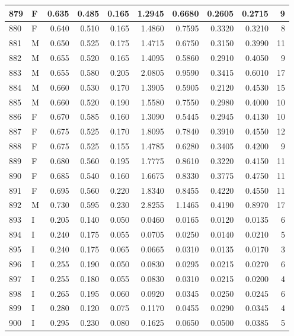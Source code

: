 \documentclass[9pt,twocolumn,twoside,]{pnas-new}
\begin{document}
\begin{tabular}{l|l|r|r|r|r|r|r|r|r}
\hline
879 & F & 0.635 & 0.485 & 0.165 & 1.2945 & 0.6680 & 0.2605 & 0.2715 & 9\\
\hline
880 & F & 0.640 & 0.510 & 0.165 & 1.4860 & 0.7595 & 0.3320 & 0.3210 & 8\\
\hline
881 & M & 0.650 & 0.525 & 0.175 & 1.4715 & 0.6750 & 0.3150 & 0.3990 & 11\\
\hline
882 & M & 0.655 & 0.520 & 0.165 & 1.4095 & 0.5860 & 0.2910 & 0.4050 & 9\\
\hline
883 & M & 0.655 & 0.580 & 0.205 & 2.0805 & 0.9590 & 0.3415 & 0.6010 & 17\\
\hline
884 & M & 0.660 & 0.530 & 0.170 & 1.3905 & 0.5905 & 0.2120 & 0.4530 & 15\\
\hline
885 & M & 0.660 & 0.520 & 0.190 & 1.5580 & 0.7550 & 0.2980 & 0.4000 & 10\\
\hline
886 & F & 0.670 & 0.585 & 0.160 & 1.3090 & 0.5445 & 0.2945 & 0.4130 & 10\\
\hline
887 & F & 0.675 & 0.525 & 0.170 & 1.8095 & 0.7840 & 0.3910 & 0.4550 & 12\\
\hline
888 & F & 0.675 & 0.525 & 0.155 & 1.4785 & 0.6280 & 0.3405 & 0.4200 & 9\\
\hline
889 & F & 0.680 & 0.560 & 0.195 & 1.7775 & 0.8610 & 0.3220 & 0.4150 & 11\\
\hline
890 & F & 0.685 & 0.540 & 0.160 & 1.6675 & 0.8330 & 0.3775 & 0.4750 & 11\\
\hline
891 & F & 0.695 & 0.560 & 0.220 & 1.8340 & 0.8455 & 0.4220 & 0.4550 & 11\\
\hline
892 & M & 0.730 & 0.595 & 0.230 & 2.8255 & 1.1465 & 0.4190 & 0.8970 & 17\\
\hline
893 & I & 0.205 & 0.140 & 0.050 & 0.0460 & 0.0165 & 0.0120 & 0.0135 & 6\\
\hline
894 & I & 0.240 & 0.175 & 0.055 & 0.0705 & 0.0250 & 0.0140 & 0.0210 & 5\\
\hline
895 & I & 0.240 & 0.175 & 0.065 & 0.0665 & 0.0310 & 0.0135 & 0.0170 & 3\\
\hline
896 & I & 0.255 & 0.190 & 0.050 & 0.0830 & 0.0295 & 0.0215 & 0.0270 & 6\\
\hline
897 & I & 0.255 & 0.180 & 0.055 & 0.0830 & 0.0310 & 0.0215 & 0.0200 & 4\\
\hline
898 & I & 0.265 & 0.195 & 0.060 & 0.0920 & 0.0345 & 0.0250 & 0.0245 & 6\\
\hline
899 & I & 0.280 & 0.120 & 0.075 & 0.1170 & 0.0455 & 0.0290 & 0.0345 & 4\\
\hline
900 & I & 0.295 & 0.230 & 0.080 & 0.1625 & 0.0650 & 0.0500 & 0.0385 & 5\\

\end{tabular}
\end{document}
